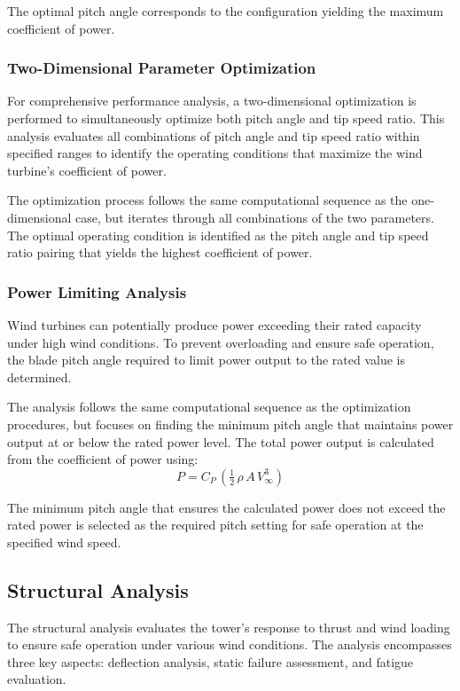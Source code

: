 \documentclass[11pt]{article}
\begin{document}
The optimal pitch angle corresponds to the configuration yielding the maximum coefficient of power.

\subsubsection{Two-Dimensional Parameter Optimization}

For comprehensive performance analysis, a two-dimensional optimization is performed to simultaneously optimize both pitch angle and tip speed ratio. This analysis evaluates all combinations of pitch angle and tip speed ratio within specified ranges to identify the operating conditions that maximize the wind turbine's coefficient of power.

The optimization process follows the same computational sequence as the one-dimensional case, but iterates through all combinations of the two parameters. The optimal operating condition is identified as the pitch angle and tip speed ratio pairing that yields the highest coefficient of power.

\subsubsection{Power Limiting Analysis}

Wind turbines can potentially produce power exceeding their rated capacity under high wind conditions. To prevent overloading and ensure safe operation, the blade pitch angle required to limit power output to the rated value is determined.

The analysis follows the same computational sequence as the optimization procedures, but focuses on finding the minimum pitch angle that maintains power output at or below the rated power level. The total power output is calculated from the coefficient of power using:
\begin{equation}
P = C_P\,\left(\tfrac{1}{2}\,\rho\,A\,V_\infty^{3}\right)
\label{eq:P_from_CP}
\end{equation}

The minimum pitch angle that ensures the calculated power does not exceed the rated power is selected as the required pitch setting for safe operation at the specified wind speed.

\subsection{Structural Analysis}

The structural analysis evaluates the tower's response to thrust and wind loading to ensure safe operation under various wind conditions. The analysis encompasses three key aspects: deflection analysis, static failure assessment, and fatigue evaluation.
\end{document}
